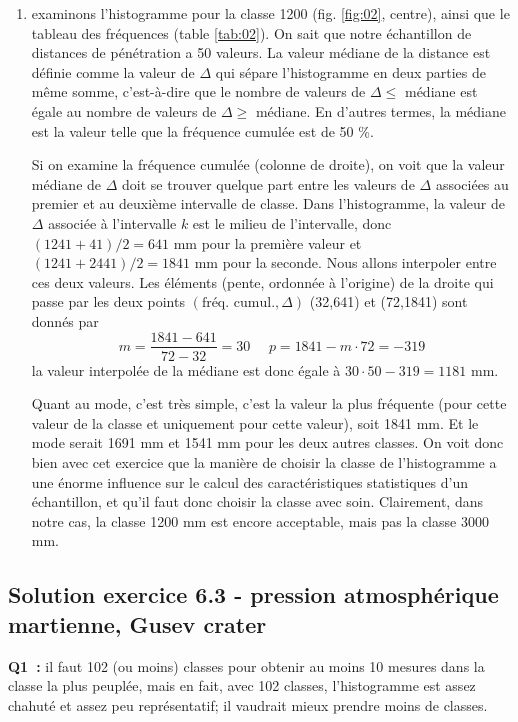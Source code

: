 \begin{enumerate}
\item examinons l'histogramme pour la classe 1200 (fig. \ref{fig:02}, centre), ainsi que le tableau des fréquences (table \ref{tab:02}). On sait que notre échantillon de distances de pénétration a 50 valeurs. La valeur médiane de la distance est définie comme la valeur de $\Delta$ qui sépare l'histogramme en deux parties de même somme, c'est-à-dire que le nombre de valeurs de $\Delta\le$ médiane est égale au nombre de valeurs de $\Delta\ge$ médiane. En d'autres termes, la médiane est la valeur telle que la fréquence cumulée est de 50 \%.

Si on examine la fréquence cumulée (colonne de droite), on voit que la valeur médiane de $\Delta$ doit se trouver quelque part entre les valeurs de $\Delta$ associées au premier et au deuxième intervalle de classe. Dans l'histogramme, la valeur de $\Delta$ associée à l'intervalle $k$ est le milieu de l'intervalle, donc $(1241+41)/2=641$ mm pour la première valeur et $(1241+2441)/2=1841$ mm pour la seconde. Nous allons interpoler entre ces deux valeurs. Les éléments (pente, ordonnée à l'origine) de la droite qui passe par les deux points $(\text{fréq. cumul.},\Delta)$ (32,641) et (72,1841) sont donnés par
$$
m=\frac{1841-641}{72-32}=30\ \ \ \ \ \ p=1841-m\cdot72=-319
$$
la valeur interpolée de la médiane est donc égale à $30\cdot50-319=1181$ mm.

Quant au mode, c'est très simple, c'est la valeur la plus fréquente (pour cette valeur de la classe et uniquement pour cette valeur), soit 1841 mm. Et le mode serait 1691 mm et 1541 mm pour les deux autres classes. On voit donc bien avec cet exercice que la manière de choisir la classe de l'histogramme a une énorme influence sur le calcul des caractéristiques statistiques d'un échantillon, et qu'il faut donc choisir la classe avec soin. Clairement, dans notre cas, la classe 1200 mm est encore acceptable, mais pas la classe 3000 mm.
\end{enumerate}

\subsection*{Solution exercice 6.3 - pression atmosphérique martienne, Gusev crater}

\textbf{Q1~:} il faut 102 (ou moins) classes pour obtenir au moins 10 mesures dans la classe la plus peuplée, mais en fait, avec 102 classes, l'histogramme est assez chahuté et assez peu représentatif; il vaudrait mieux prendre moins de classes.

